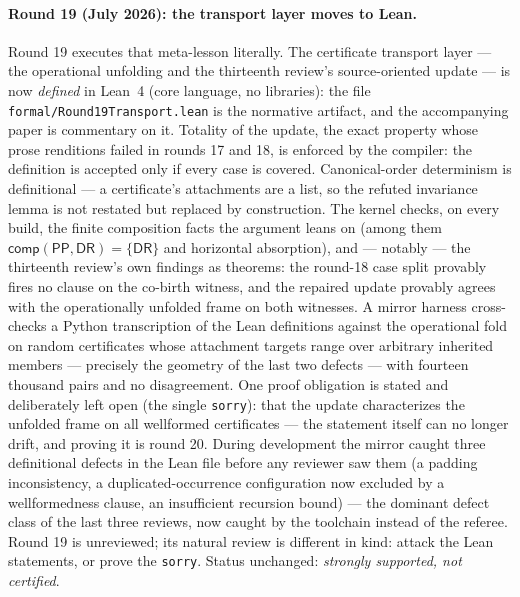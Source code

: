 \documentclass[
]{ceurart}
\theoremstyle{definition}
\newcommand{\DR}{\ensuremath{\mathsf{DR}}}
\newcommand{\PP}{\ensuremath{\mathsf{PP}}}
\newcommand{\comp}{\ensuremath{\mathsf{comp}}}
\begin{document}
\paragraph{Round 19 (July 2026): the transport layer moves to Lean.}
Round 19 executes that meta-lesson literally.  The certificate transport
layer --- the operational unfolding and the thirteenth review's
source-oriented update --- is now \emph{defined} in Lean~4 (core
language, no libraries): the file \texttt{formal/Round19Transport.lean}
is the normative artifact, and the accompanying paper is commentary on
it.  Totality of the update, the exact property whose prose renditions
failed in rounds 17 and 18, is enforced by the compiler: the definition
is accepted only if every case is covered.  Canonical-order determinism
is definitional --- a certificate's attachments are a list, so the
refuted invariance lemma is not restated but replaced by construction.
The kernel checks, on every build, the finite composition facts the
argument leans on (among them
$\comp(\PP,\DR)=\{\DR\}$ and horizontal absorption), and --- notably ---
the thirteenth review's own findings as theorems: the round-18 case
split provably fires no clause on the co-birth witness, and the repaired
update provably agrees with the operationally unfolded frame on both
witnesses.  A mirror harness cross-checks a Python transcription of the
Lean definitions against the operational fold on random certificates
whose attachment targets range over arbitrary inherited members ---
precisely the geometry of the last two defects --- with fourteen
thousand pairs and no disagreement.  One proof obligation is stated and
deliberately left open (the single \texttt{sorry}): that the update
characterizes the unfolded frame on all wellformed certificates ---
the statement itself can no longer drift, and proving it is round 20.
During development the mirror caught three definitional defects in the
Lean file before any reviewer saw them (a padding inconsistency, a
duplicated-occurrence configuration now excluded by a wellformedness
clause, an insufficient recursion bound) --- the dominant defect class
of the last three reviews, now caught by the toolchain instead of the
referee.  Round 19 is unreviewed; its natural review is different in
kind: attack the Lean statements, or prove the \texttt{sorry}.  Status
unchanged: \emph{strongly supported, not certified}.
\end{document}
